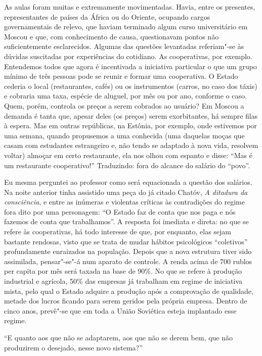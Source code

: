 As aulas foram muitas e extremamente movimentadas. Havia, entre os
presentes, representantes de países da África ou do Oriente, ocupando
cargos governamentais de relevo, que haviam terminado algum curso
universitário em Moscou e que, com conhecimento de causa, questionavam
pontos não suficientemente esclarecidos. Algumas das questões levantadas
referiam"-se às dúvidas suscitadas por experiências do cotidiano. As
cooperativas, por exemplo. Entendemos todos que agora é incentivada a
iniciativa particular o que um grupo mínimo de três pessoas pode se
reunir e formar uma cooperativa. O Estado cederia o local (restaurantes,
cafés) ou os instrumentos (carros, no caso dos táxis) e cobraria uma
taxa, espécie de aluguel, por mês ou por ano, conforme o caso. Quem,
porém, controla os preços a serem cobrados ao usuário? Em Moscou a
demanda é tanta que, apesar deles (os preços) serem exorbitantes, há
sempre filas à espera. Mas em outras repúblicas, na Estônia, por
exemplo, onde estivemos por uma semana, quando propusemos a uma
conhecida (uma daquelas moças que casam com estudantes estrangeiro e,
não tendo se adaptado à nova vida, resolvem voltar) almoçar em certo
restaurante, ela nos olhou com espanto e disse: ``Mas é um restaurante
cooperativo!'' Traduzindo: fora do alcance do salário do ``povo''.

Eu mesma perguntei ao professor como será equacionada a questão dos
salários. Na noite anterior tinha assistido uma peça do já citado Chatóv,
\emph{A ditadura da consciência}, e entre as inúmeras e violentas
críticas às contradições do regime fora dito por uma personagem: ``O
Estado faz de conta que nos paga e nós fazemos de conta que
trabalhamos''. A resposta foi imediata e direta: no que se refere às
cooperativas, há todo interesse de que, por enquanto, elas sejam
bastante rendosas, visto que se trata de mudar hábitos psicológicos
``coletivos'' profundamente enraizados na população. Depois que a nova
estrutura tiver sido assimilada, pensar"-se"-á num aparato de controle. A
renda acima de 700 rublos per capita por mês será taxada na base de
90\%. No que se refere à produção industrial e agrícola, 50\% das
empresas já trabalham em regime de iniciativa mista, pelo qual o Estado
adquire a produção após a comprovação de qualidade, metade dos lucros
ficando para serem geridos pela própria empresa. Dentro de cinco anos,
prevê"-se que em toda a União Soviética esteja implantado esse regime.

``E quanto aos que não se adaptarem, aos que não se derem bem, que não
produzirem o desejado, nesse novo sistema?''

